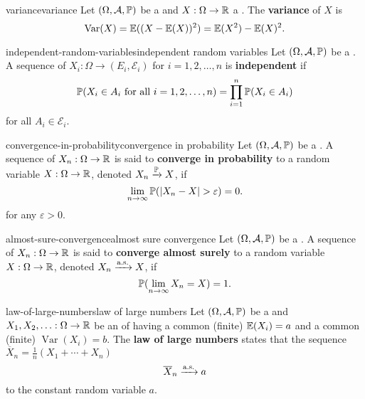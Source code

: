 \begin{topic}{variance}{variance}
    Let $(\Omega, \mathcal{A}, \mathbb{P})$ be a  and $X : \Omega \to \mathbb{R}$ a . The \textbf{variance} of $X$ is
    \[ \operatorname{Var}(X) = \mathbb{E}((X - \mathbb{E}(X))^2) = \mathbb{E}(X^2) - \mathbb{E}(X)^2 . \]
\end{topic}

\begin{topic}{independent-random-variables}{independent random variables}
    Let $(\Omega, \mathcal{A}, \mathbb{P})$ be a . A sequence of  $X_i : \Omega \to (E_i, \mathcal{E}_i)$ for $i = 1, 2, \ldots, n$ is \textbf{independent} if
    \[ \mathbb{P}(X_i \in A_i \textup{ for all } i = 1, 2, \ldots, n) = \prod_{i = 1}^{n} \mathbb{P}(X_i \in A_i) \]
    for all $A_i \in \mathcal{E}_i$.
\end{topic}

\begin{topic}{convergence-in-probability}{convergence in probability}
    Let $(\Omega, \mathcal{A}, \mathbb{P})$ be a . A sequence of  $X_n : \Omega \to \mathbb{R}$ is said to \textbf{converge in probability} to a random variable $X : \Omega \to \mathbb{R}$, denoted $X_n \xrightarrow{\mathbb{P}} X$, if
    \[ \lim_{n \to \infty} \mathbb{P}(|X_n - X| > \varepsilon) = 0 . \]
    for any $\varepsilon > 0$.
\end{topic}

\begin{topic}{almost-sure-convergence}{almost sure convergence}
    Let $(\Omega, \mathcal{A}, \mathbb{P})$ be a . A sequence of  $X_n : \Omega \to \mathbb{R}$ is said to \textbf{converge almost surely} to a random variable $X : \Omega \to \mathbb{R}$, denoted $X_n \xrightarrow{\textup{a.s.}} X$, if
    \[ \mathbb{P}(\lim_{n \to \infty} X_n = X) = 1 . \]
\end{topic}

\begin{topic}{law-of-large-numbers}{law of large numbers}
    Let $(\Omega, \mathcal{A}, \mathbb{P})$ be a  and $X_1, X_2, \ldots : \Omega \to \mathbb{R}$ be an  of  having a common (finite)  $\mathbb{E}(X_i) = a$ and a common (finite)  $\operatorname{Var}(X_i) = b$. The \textbf{law of large numbers} states that the sequence $\overline{X}_n = \frac{1}{n} (X_1 + \cdots + X_n)$ 
    \[ \overline{X}_n \xrightarrow{\textup{a.s.}} a \]
    to the constant random variable $a$.
\end{topic}

